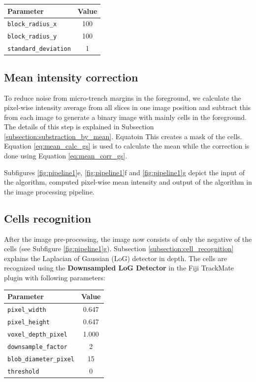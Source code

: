 \documentclass[pdftex,12pt,a4paper]{report}
\begin{document}
\begin{table}[H]
\centering
\begin{tabular}[t]{ l | c }
Parameter & Value \\
\hline
\texttt{block\_radius\_x} & 100 \\
\texttt{block\_radius\_y} & 100 \\
\texttt{standard\_deviation} & 1 \\
\end{tabular}
\end{table}

\subsection{Mean intensity correction}
\label{subsection:mean_intensity_correction}

To reduce noise from micro-trench margins in the foreground, we calculate the pixel-wise intensity average from all slices in one image position and subtract this from each image to generate a binary image with mainly cells in the foreground. The details of this step is explained in Subsection \ref{subsection:substraction_by_mean}. Equatoin  This creates a mask of the cells.  Equation \ref{eq:mean_calc_gs} is used to calculate the mean while the correction is done using Equation \ref{eq:mean_corr_gs}.

Subfigures \ref{fig:pipeline1}e, \ref{fig:pipeline1}f and \ref{fig:pipeline1}g depict the input of the algorithm, computed pixel-wise mean intensity and output of the algorithm in the image processing pipeline.

\subsection{Cells recognition}

After the image pre-processing, the image now consists of only the negative of the cells (see Subfigure \ref{fig:pipeline1}g). Subsection \ref{subsection:cell_recognition} explains the Laplacian of Gaussian (LoG) detector in depth. The cells are recognized using the \textbf{Downsampled LoG Detector} in the Fiji TrackMate plugin \cite{tinevez2017trackmate} with following parameters:

\begin{table}[H]
\centering
\begin{tabular}[t]{ l | c }
Parameter & Value \\
\hline
\texttt{pixel\_width} & 0.647 \\
\texttt{pixel\_height} & 0.647 \\
\texttt{voxel\_depth\_pixel} & 1.000 \\
\texttt{downsample\_factor} & 2 \\
\texttt{blob\_diameter\_pixel} & 15 \\
\texttt{threshold} & 0 \\
\end{tabular}
\end{table}
\end{document}
